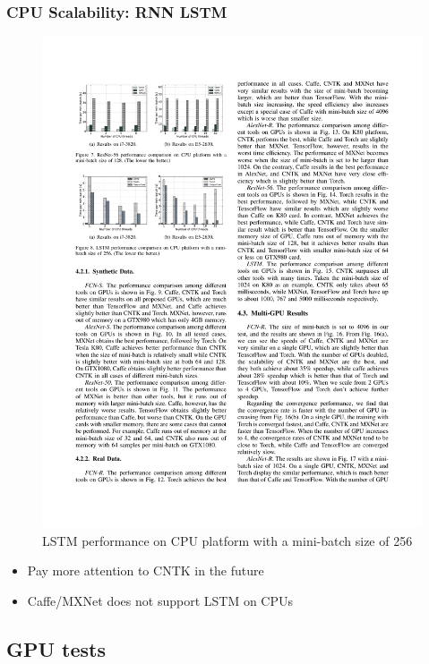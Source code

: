 \begin{frame}
	\MyLogo
	\frametitle{CPU Scalability: RNN LSTM}  
\vskip -5pt
	\begin{figure}[htbp] 
		\includegraphics[width=\linewidth]{figures/LSTM1.pdf} 
		\caption{LSTM performance on CPU platform with a mini-batch size of 256}
	\end{figure}
	
\vskip -12pt
\begin{mdframed}[style=mystyle1]
\begin{itemize}
\item Pay more attention to CNTK in the future
\item Caffe/MXNet does not support LSTM on CPUs
\end{itemize}
\end{mdframed}

\end{frame}

\subsection{GPU tests}

